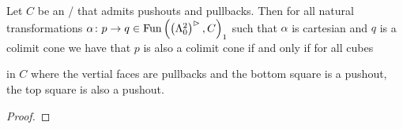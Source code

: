 \begin{lemma}\label{lem:univForPushouts}
    Let $C$ be an \inftycat/ that admits pushouts and pullbacks.
    Then for all natural transformations $\alpha\colon p\to q\in\operatorname{Fun}\left(\left(\Lambda^2_0\right)^{\rhd},C\right)_1$ such that $\alpha$ is cartesian and $q$ is a colimit cone we have that $p$ is also a colimit cone if and only if for all cubes
    \begin{center}
    \end{center}
    in $C$ where the vertial faces are pullbacks and the bottom square is a pushout, the top square is also a pushout.
    \begin{proof}
    \end{proof}
\end{lemma}
